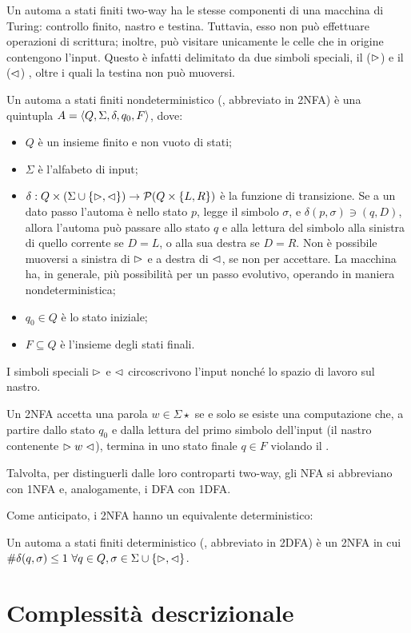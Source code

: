 Un automa a stati finiti two-way ha le stesse componenti di una macchina di Turing: controllo finito, nastro e testina. Tuttavia, esso non può effettuare operazioni di scrittura; inoltre, può visitare unicamente le celle che in origine contengono l'input. Questo è infatti delimitato da due simboli speciali, il  ($\vartriangleright$) e il  ($\vartriangleleft$) , oltre i quali la testina non può muoversi.
\begin{defin}
	Un automa a stati finiti  nondeterministico (, abbreviato in 2NFA) è una quintupla $A=\langle Q,\Sigma,\delta,q_0,F \rangle$, dove:
	\begin{itemize}
		\item $Q$ è un insieme finito e non vuoto di stati;
		\item $\Sigma$ è l'alfabeto di input;
		\item $\delta:Q\times(\Sigma\cup\left\{ \vartriangleright,\vartriangleleft \right\})\to\mathcal P(Q\times\left\{ L,R \right\})$ è la funzione di transizione. Se a un dato passo l'automa è nello stato $p$, legge il simbolo $\sigma$, e $\delta(p,\sigma)\ni (q,D)$, allora l'automa può passare allo stato $q$ e alla lettura del simbolo alla sinistra di quello corrente se $D=L$, o alla sua destra se $D=R$. Non è possibile muoversi a sinistra di $\vartriangleright$ e a destra di $\vartriangleleft$, se non per accettare. La macchina ha, in generale, più possibilità per un passo evolutivo, operando in maniera nondeterministica;
		\item $q_0\in Q$ è lo stato iniziale;
		\item $F\subseteq Q$ è l'insieme degli stati finali.
	\end{itemize}
	I simboli speciali $\vartriangleright$ e $\vartriangleleft$ circoscrivono l'input nonché lo spazio di lavoro sul nastro.

	Un 2NFA accetta una parola $w\in\Sigma\star$ se e solo se esiste una computazione che, a partire dallo stato $q_0$ e dalla lettura del primo simbolo dell'input (il nastro contenente $\vartriangleright w\vartriangleleft$), termina in uno stato finale $q\in F$ violando il .
\end{defin}
Talvolta, per distinguerli dalle loro controparti two-way, gli NFA  si abbreviano con 1NFA e, analogamente, i DFA con 1DFA.

Come anticipato, i 2NFA hanno un equivalente deterministico:
\begin{defin}
	Un automa a stati finiti  deterministico (, abbreviato in 2DFA) è un 2NFA in cui $\# \delta(q,\sigma)\leq 1 ~ \forall q\in Q,\sigma\in\Sigma\cup\left\{ \vartriangleright,\vartriangleleft \right\}$.
\end{defin}



\section{Complessità descrizionale}
